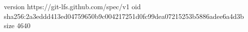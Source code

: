 version https://git-lfs.github.com/spec/v1
oid sha256:2a3eddd413ed04759650b9c004217251d0fc99dea07215253b5886adee6a4d3b
size 4640
